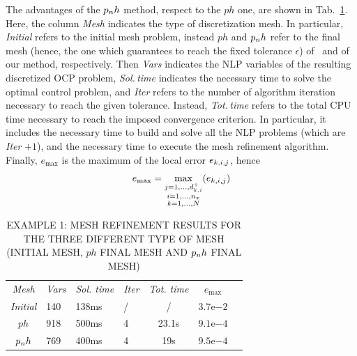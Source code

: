 The advantages of the $p_{n}h$ method, respect to the $ph$ one, are shown in Tab.~\ref{tab:tablevanderpol}. Here, the column \emph{Mesh} indicates the type of discretization mesh. In particular, \emph{Initial} refers to the initial mesh problem, instead $ph$ and $p_{n}h$ refer to the final mesh (hence, the one which guarantees to reach the fixed tolerance $\epsilon$) of~\cite{Patterson:OCAM:2015} and of our method, respectively. Then \emph{Vars} indicates the NLP variables of the resulting discretized OCP problem, \emph{Sol.\,time} indicates the necessary time to solve the optimal control problem, and \emph{Iter} refers to the number of algorithm iteration necessary to reach the given tolerance. Instead, \emph{Tot.\,time} refers to the total CPU time necessary to reach the imposed convergence criterion. In particular, it includes the necessary time to build and solve all the NLP problems  (which are \emph{Iter} $+1$), and the necessary time to execute the mesh refinement algorithm. Finally, $e_\text{max}$  is the maximum of the local error $e_{k,i,j}$, hence
\begin{equation}
e_\text{max}= \max\limits_{\substack{j = 1, \dots, d_{k,i}^{+} \\ i = 1, \dots, n_x \\ k = 1, \dots, N}} (e_{k,i,j})
\end{equation}
\begin{table}[t]
	\caption{EXAMPLE 1: MESH REFINEMENT RESULTS FOR THE THREE DIFFERENT TYPE OF MESH (INITIAL MESH, $ph$ FINAL MESH AND $p_{n}h$ FINAL MESH)}
	\begin{center}
		\label{tab:tablevanderpol}
		\begin{tabular}{c l l l c c c}
			& & \\ %
			\hline
			\emph{Mesh} & \emph{Vars} & \emph{Sol. time} & \emph{Iter} & \emph{Tot. time} & $e_\text{max}$ \\
			\hline
			\emph{Initial} & 140 & 138ms & / & / &  $3.7\mathrm{e}{-2}$\\
			$ph$ & 918 & 500ms & 4 & 23.1s & $9.1\mathrm{e}{-4}$ \\
			$p_{n}h$ & 769 & 400ms & 4 & 19s & $9.5\mathrm{e}{-4}$ \\
			\hline
		\end{tabular}
	\end{center}
\end{table}
